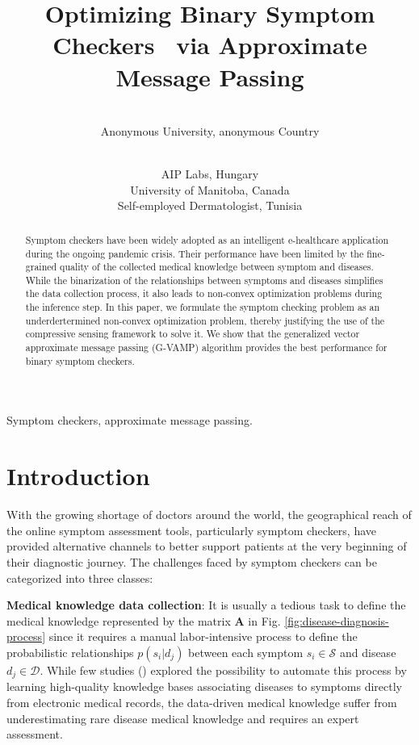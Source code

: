 \documentclass[pmlr,twocolumn,10pt]{jmlr} %
\title{\hspace{1.7cm}Optimizing Binary Symptom Checkers \titlebreak ~via Approximate Message Passing}
\author{%
\Name{Anonymous Authors } \Email{anonymous@email.com}\\
\addr Anonymous University, anonymous Country
}
\author{%
\Name{Mohamed Akrout}%
\Email{mohamed@aip.ai}\\
\addr AIP Labs, Hungary
\AND
\Name{Faouzi Bellili, Amine Mezghani}%
\Email{\{Faouzi.Bellili, Amine.Mezghani\}@umanitoba.ca}\\
\addr University of Manitoba, Canada
\AND
\Name{Hayet Amdouni} \Email{dr.amdounihayet@yahoo.fr}\\
\addr Self-employed Dermatologist, Tunisia
}
\begin{document}
\maketitle

\begin{abstract}
Symptom checkers have been widely adopted as an intelligent e-healthcare application during the ongoing pandemic crisis. Their performance have been limited by the fine-grained quality of the collected medical knowledge between symptom and diseases. While the binarization of the relationships between symptoms and diseases simplifies the data collection process, it also leads to non-convex optimization problems during the inference step. In this paper, we formulate the symptom checking problem as an underdertermined non-convex optimization problem, thereby justifying the use of the compressive sensing framework to solve it. We show that the generalized vector approximate message passing (G-VAMP) algorithm provides the best performance for binary symptom checkers.
\end{abstract}
\begin{keywords}
Symptom checkers, approximate message passing.
\end{keywords}

\vspace{-0.4cm}
\section{Introduction}
\vspace{-0.2cm}
With the growing shortage of doctors around the world, the geographical reach of the online symptom assessment tools, particularly symptom checkers, have provided alternative channels to better support patients at the very beginning of their diagnostic journey. The challenges faced by symptom checkers can be categorized into three classes:

\noindent\textbf{Medical knowledge data collection}: It is usually a tedious task to define the medical knowledge represented by the matrix $\mathbf{A}$ in Fig. \ref{fig:disease-diagnosis-process} since it requires a manual labor-intensive process to define the probabilistic relationships $p(s_i|d_j)$ between each symptom $s_i \in \mathcal{S}$ and disease $d_j \in \mathcal{D}$. While few studies (\cite{rotmensch2017learning}) explored the possibility to automate this process by learning high-quality knowledge bases associating diseases to symptoms directly from electronic medical records, the data-driven medical knowledge suffer from underestimating rare disease medical knowledge and requires an expert assessment.
\end{document}
